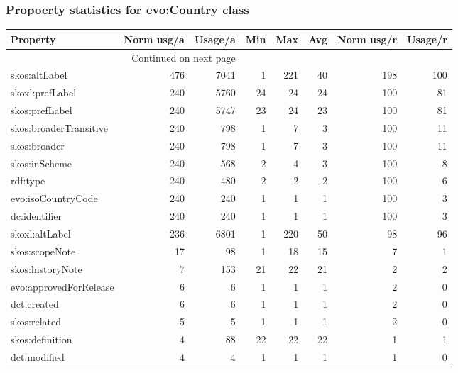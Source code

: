 \documentclass[10pt,a4paper,titlepage,final]{article}
\begin{document}
\subsubsection{Propoerty statistics for evo:Country class}
\begin{longtable}{lrrrrrrr}
\toprule
               Property &  Norm usg/a &  Usage/a &  Min &  Max &  Avg &  Norm usg/r &  Usage/r \\
\midrule
\endhead
\midrule
\multicolumn{3}{r}{{Continued on next page}} \\
\midrule
\endfoot

\bottomrule
\endlastfoot
          skos:altLabel &         476 &     7041 &    1 &  221 &   40 &         198 &      100 \\
        skoxl:prefLabel &         240 &     5760 &   24 &   24 &   24 &         100 &       81 \\
         skos:prefLabel &         240 &     5747 &   23 &   24 &   23 &         100 &       81 \\
 skos:broaderTransitive &         240 &      798 &    1 &    7 &    3 &         100 &       11 \\
           skos:broader &         240 &      798 &    1 &    7 &    3 &         100 &       11 \\
          skos:inScheme &         240 &      568 &    2 &    4 &    3 &         100 &        8 \\
               rdf:type &         240 &      480 &    2 &    2 &    2 &         100 &        6 \\
     evo:isoCountryCode &         240 &      240 &    1 &    1 &    1 &         100 &        3 \\
          dc:identifier &         240 &      240 &    1 &    1 &    1 &         100 &        3 \\
         skoxl:altLabel &         236 &     6801 &    1 &  220 &   50 &          98 &       96 \\
         skos:scopeNote &          17 &       98 &    1 &   18 &   15 &           7 &        1 \\
       skos:historyNote &           7 &      153 &   21 &   22 &   21 &           2 &        2 \\
 evo:approvedForRelease &           6 &        6 &    1 &    1 &    1 &           2 &        0 \\
            dct:created &           6 &        6 &    1 &    1 &    1 &           2 &        0 \\
           skos:related &           5 &        5 &    1 &    1 &    1 &           2 &        0 \\
        skos:definition &           4 &       88 &   22 &   22 &   22 &           1 &        1 \\
           dct:modified &           4 &        4 &    1 &    1 &    1 &           1 &        0 \\
\end{longtable}
\end{document}

